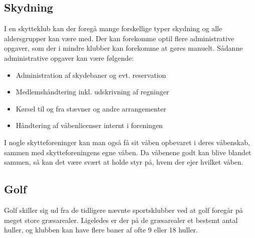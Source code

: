 

\subsection{Skydning}
I en skytteklub kan der foregå mange forskellige typer skydning og alle aldersgrupper kan være med. Der kan forekomme optil flere administrative opgaver, som der i mindre klubber kan forekomme at gøres manuelt. Sådanne administrative opgaver kan være følgende:
\begin{itemize}
\item Administration af skydebaner og evt. reservation
\item Medlemshåndtering inkl. udskrivning af regninger
\item Kørsel til og fra stævner og andre arrangementer
\item Håndtering af våbenlicenser internt i foreningen
\end{itemize}
I nogle skytteforeninger kan man også få sit våben opbevaret i deres våbenskab, sammen med skytteforeningens egne våben. Da våbenene godt kan blive blandet sammen, så kan det være svært at holde styr på, hvem der ejer hvilket våben.

\subsection{Golf}
Golf skiller sig ud fra de tidligere nævnte sportsklubber ved at golf foregår på meget store græsarealer. Ligeledes er der på de græsarealer et bestemt antal huller, og klubben kan have flere baner af ofte 9 eller 18 huller. 

